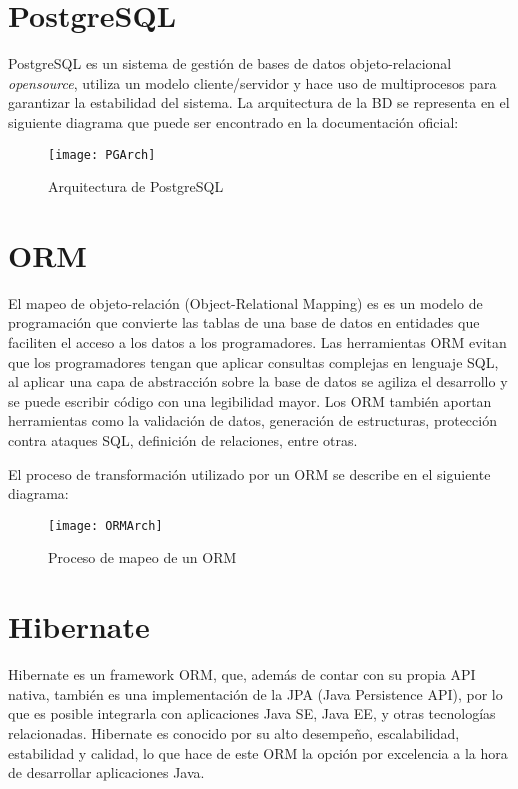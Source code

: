 \section{PostgreSQL}
PostgreSQL es un sistema de gestión de bases de datos objeto-relacional \textit{opensource}, utiliza un modelo cliente/servidor y hace uso de multiprocesos para garantizar la estabilidad del sistema.
La arquitectura de la BD se representa en el siguiente diagrama que puede ser encontrado en la documentación oficial:

\begin{figure}[H]
  \begin{center}
    \texttt{[image: PGArch]}
  \end{center}
  \caption{Arquitectura de PostgreSQL}
\end{figure}

\section{ORM}
El mapeo de objeto-relación (Object-Relational Mapping) es es un modelo de programación que convierte las tablas de una base de datos en entidades que faciliten el acceso a los datos a los programadores.
Las herramientas ORM evitan que los programadores tengan que aplicar consultas complejas en lenguaje SQL, al aplicar una capa de abstracción sobre la base de datos se agiliza el desarrollo y se puede escribir código con una legibilidad mayor.
Los ORM también aportan herramientas como la validación de datos, generación de estructuras, protección contra ataques SQL, definición de relaciones, entre otras.

El proceso de transformación utilizado por un ORM se describe en el siguiente diagrama:

\begin{figure}[H]
  \begin{center}
    \texttt{[image: ORMArch]}
  \end{center}
  \caption{Proceso de mapeo de un ORM}
\end{figure}

\section{Hibernate}
Hibernate es un framework ORM, que, además de contar con su propia API nativa, también es una implementación de la JPA (Java Persistence API), por lo que es posible integrarla con aplicaciones Java SE, Java EE, y otras tecnologías relacionadas.
Hibernate es conocido por su alto desempeño, escalabilidad, estabilidad y calidad, lo que hace de este ORM la opción por excelencia a la hora de desarrollar aplicaciones Java. 


